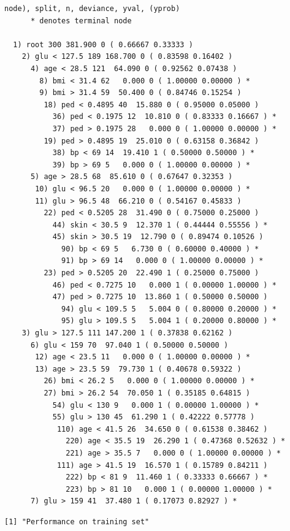 \documentclass[
  letterpaper,
  DIV=11,
  numbers=noendperiod]{scrartcl}
\begin{document}
\begin{verbatim}
node), split, n, deviance, yval, (yprob)
      * denotes terminal node

  1) root 300 381.900 0 ( 0.66667 0.33333 )  
    2) glu < 127.5 189 168.700 0 ( 0.83598 0.16402 )  
      4) age < 28.5 121  64.090 0 ( 0.92562 0.07438 )  
        8) bmi < 31.4 62   0.000 0 ( 1.00000 0.00000 ) *
        9) bmi > 31.4 59  50.400 0 ( 0.84746 0.15254 )  
         18) ped < 0.4895 40  15.880 0 ( 0.95000 0.05000 )  
           36) ped < 0.1975 12  10.810 0 ( 0.83333 0.16667 ) *
           37) ped > 0.1975 28   0.000 0 ( 1.00000 0.00000 ) *
         19) ped > 0.4895 19  25.010 0 ( 0.63158 0.36842 )  
           38) bp < 69 14  19.410 1 ( 0.50000 0.50000 ) *
           39) bp > 69 5   0.000 0 ( 1.00000 0.00000 ) *
      5) age > 28.5 68  85.610 0 ( 0.67647 0.32353 )  
       10) glu < 96.5 20   0.000 0 ( 1.00000 0.00000 ) *
       11) glu > 96.5 48  66.210 0 ( 0.54167 0.45833 )  
         22) ped < 0.5205 28  31.490 0 ( 0.75000 0.25000 )  
           44) skin < 30.5 9  12.370 1 ( 0.44444 0.55556 ) *
           45) skin > 30.5 19  12.790 0 ( 0.89474 0.10526 )  
             90) bp < 69 5   6.730 0 ( 0.60000 0.40000 ) *
             91) bp > 69 14   0.000 0 ( 1.00000 0.00000 ) *
         23) ped > 0.5205 20  22.490 1 ( 0.25000 0.75000 )  
           46) ped < 0.7275 10   0.000 1 ( 0.00000 1.00000 ) *
           47) ped > 0.7275 10  13.860 1 ( 0.50000 0.50000 )  
             94) glu < 109.5 5   5.004 0 ( 0.80000 0.20000 ) *
             95) glu > 109.5 5   5.004 1 ( 0.20000 0.80000 ) *
    3) glu > 127.5 111 147.200 1 ( 0.37838 0.62162 )  
      6) glu < 159 70  97.040 1 ( 0.50000 0.50000 )  
       12) age < 23.5 11   0.000 0 ( 1.00000 0.00000 ) *
       13) age > 23.5 59  79.730 1 ( 0.40678 0.59322 )  
         26) bmi < 26.2 5   0.000 0 ( 1.00000 0.00000 ) *
         27) bmi > 26.2 54  70.050 1 ( 0.35185 0.64815 )  
           54) glu < 130 9   0.000 1 ( 0.00000 1.00000 ) *
           55) glu > 130 45  61.290 1 ( 0.42222 0.57778 )  
            110) age < 41.5 26  34.650 0 ( 0.61538 0.38462 )  
              220) age < 35.5 19  26.290 1 ( 0.47368 0.52632 ) *
              221) age > 35.5 7   0.000 0 ( 1.00000 0.00000 ) *
            111) age > 41.5 19  16.570 1 ( 0.15789 0.84211 )  
              222) bp < 81 9  11.460 1 ( 0.33333 0.66667 ) *
              223) bp > 81 10   0.000 1 ( 0.00000 1.00000 ) *
      7) glu > 159 41  37.480 1 ( 0.17073 0.82927 ) *
\end{verbatim}

\begin{verbatim}
[1] "Performance on training set"
\end{verbatim}
\end{document}
